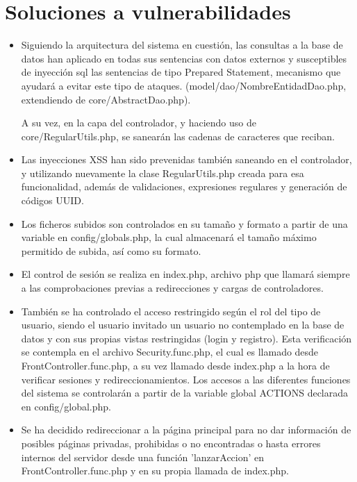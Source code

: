 \section{Soluciones a vulnerabilidades}
\begin{itemize}


\item Siguiendo la arquitectura del sistema en cuesti\'{o}n, las consultas a la base de datos han aplicado en todas sus sentencias con datos externos y susceptibles de inyecci\'{o}n sql las sentencias de tipo Prepared Statement, mecanismo que ayudar\'{a} a evitar este tipo de ataques. (model/dao/NombreEntidadDao.php, extendiendo de core/AbstractDao.php).

A su vez, en la capa del controlador, y haciendo uso de core/RegularUtils.php, se sanear\'{a}n las cadenas de caracteres que reciban.

\item Las inyecciones XSS han sido prevenidas tambi\'{e}n saneando en el controlador, y utilizando nuevamente la clase RegularUtils.php creada para esa funcionalidad, adem\'{a}s de validaciones, expresiones regulares y generaci\'{o}n de c\'{o}digos UUID.

\item Los ficheros subidos son controlados en su tama\~{n}o y formato a partir de una variable en config/globals.php, la cual almacenar\'{a} el tama\~{n}o m\'{a}ximo permitido de subida, as\'{i} como su formato. 

\item El control de sesi\'{o}n se realiza en index.php, archivo php que llamar\'{a} siempre a las comprobaciones previas a redirecciones y cargas de controladores.

\item Tambi\'{e}n se ha controlado el acceso restringido seg\'{u}n el rol del tipo de usuario, siendo el usuario invitado un usuario no contemplado en la base de datos y con sus propias vistas restringidas (login y registro). Esta verificaci\'{o}n se contempla en el archivo Security.func.php, el cual es llamado desde FrontController.func.php, a su vez llamado desde index.php a la hora de verificar sesiones y redireccionamientos. Los accesos a las diferentes funciones del sistema se controlar\'{a}n a partir de la variable global ACTIONS declarada en config/global.php. 

\item Se ha decidido redireccionar a la p\'{a}gina principal para no dar informaci\'{o}n de posibles p\'{a}ginas privadas, prohibidas o no encontradas o hasta errores internos del servidor desde una funci\'{o}n 'lanzarAccion' en FrontController.func.php y en su propia llamada de index.php.


\end{itemize}
